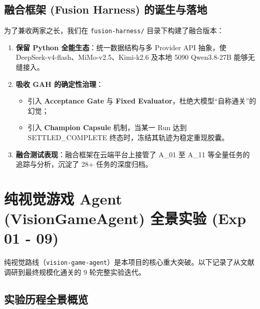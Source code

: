 \documentclass[11pt,a4paper]{ctexart}
\begin{document}
\subsection{融合框架 (Fusion Harness) 的诞生与落地}
为了兼收两家之长，我们在 \texttt{fusion-harness/} 目录下构建了融合版本：
\begin{enumerate}
  \item \textbf{保留 Python 全能生态}：统一数据结构与多 Provider API 抽象，使 DeepSeek-v4-flash、MiMo-v2.5、Kimi-k2.6 及本地 5090 Qwen3.8-27B 能够无缝接入。
  \item \textbf{吸收 GAH 的确定性治理}：
    \begin{itemize}
      \item 引入 \textbf{Acceptance Gate} 与 \textbf{Fixed Evaluator}，杜绝大模型“自称通关”的幻觉；
      \item 引入 \textbf{Champion Capsule} 机制，当某一 Run 达到 SETTLED\_COMPLETE 终态时，冻结其轨迹为稳定重现胶囊。
    \end{itemize}
  \item \textbf{融合测试表现}：融合框架在云端平台上接管了 A\_01 至 A\_11 等全量任务的追踪与分析，沉淀了 28+ 任务的深度归档。
\end{enumerate}

\newpage
\section{纯视觉游戏 Agent (VisionGameAgent) 全景实验 (Exp 01 - 09)}

纯视觉路线（\texttt{vision-game-agent}）是本项目的核心重大突破。以下记录了从文献调研到最终规模化通关的 9 轮完整实验迭代。

\subsection{实验历程全景概览}
\end{document}
